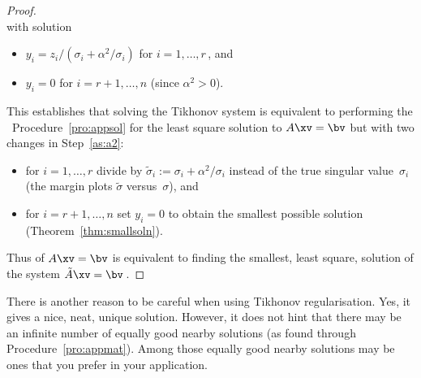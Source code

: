 \begin{proof}
\begin{equation*}
\end{equation*}
with solution 
\begin{itemize}
\item \(y_i=z_i/(\sigma_i+\alpha^2/\sigma_i)\) for \(i=1,\ldots,r\)\,, and
\item \(y_i=0\) for \(i=r+1,\ldots,n\) (since \(\alpha^2>0\)).
\end{itemize}
This establishes that solving the Tikhonov system is equivalent to performing the \svd\ Procedure~\ref{pro:appsol} for the least square solution to \(A\xv=\bv\) but with two changes in Step~\ref{as:a2}:
\begin{itemize}
\item for $i=1,\ldots,r$ divide by \(\tilde\sigma_i:=\sigma_i+\alpha^2/\sigma_i\) instead of the true singular value~\(\sigma_i\) (the margin plots \(\tilde\sigma\) versus~\(\sigma\)), and
\item for $i=r+1,\ldots,n$ set \(y_i=0\) to obtain the smallest possible solution (Theorem~\ref{thm:smallsoln}).
\end{itemize}
Thus  of \(A\xv=\bv\) is equivalent to finding the smallest, {least square}, solution of the system \(\tilde A\xv=\bv\)\,.
\end{proof}


There is another reason to be careful when using Tikhonov regularisation. 
Yes, it gives a nice, neat, unique solution.
However, it does not hint that there may be an infinite number of equally good nearby solutions (as found through Procedure~\ref{pro:appmat}).
Among those equally good nearby solutions may be ones that you prefer in your application.

